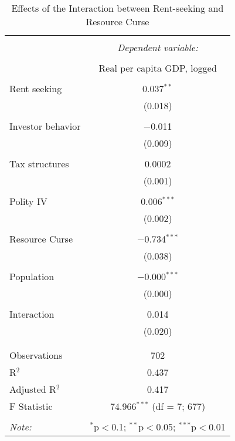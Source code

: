 \documentclass[12pt]{report}   	%
\begin{document}
\begin{table}[h] \centering 
  \caption{Effects of the Interaction between Rent-seeking and Resource Curse} 
  \label{} 
\begin{tabular}{@{\extracolsep{5pt}}lc} 
\\[-1.8ex]\hline 
\hline \\[-1.8ex] 
 & \multicolumn{1}{c}{\textit{Dependent variable:}} \\ 
\cline{2-2} 
\\[-1.8ex] & Real per capita GDP, logged \\ 
\hline \\[-1.8ex] 
 Rent seeking & 0.037$^{**}$ \\ 
  & (0.018) \\ 
  & \\ 
 Investor behavior & $-$0.011 \\ 
  & (0.009) \\ 
  & \\ 
 Tax structures & 0.0002 \\ 
  & (0.001) \\ 
  & \\ 
 Polity IV & 0.006$^{***}$ \\ 
  & (0.002) \\ 
  & \\ 
 Resource Curse & $-$0.734$^{***}$ \\ 
  & (0.038) \\ 
  & \\ 
 Population & $-$0.000$^{***}$ \\ 
  & (0.000) \\ 
  & \\ 
 Interaction & 0.014 \\ 
  & (0.020) \\ 
  & \\ 
\hline \\[-1.8ex] 
Observations & 702 \\ 
R$^{2}$ & 0.437 \\ 
Adjusted R$^{2}$ & 0.417 \\ 
F Statistic & 74.966$^{***}$ (df = 7; 677) \\ 
\hline 
\hline \\[-1.8ex] 
\textit{Note:}  & \multicolumn{1}{r}{$^{*}$p$<$0.1; $^{**}$p$<$0.05; $^{***}$p$<$0.01} \\ 
\end{tabular} 
\end{table} 
\end{document}
